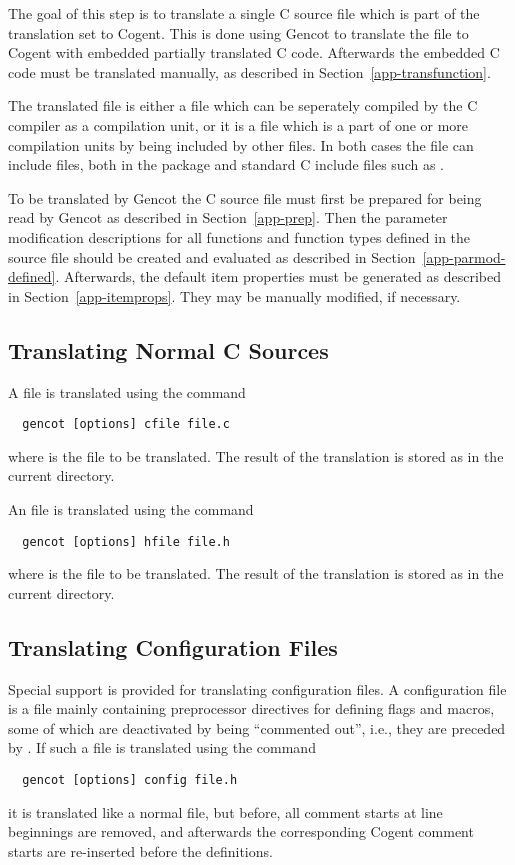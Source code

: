 The goal of this step is to translate a single C source file which is part of the translation set to Cogent.
This is done using Gencot to translate the file to Cogent with embedded partially translated C code.
Afterwards the embedded C code must be translated manually, as described in Section~\ref{app-transfunction}.

The translated file is either a  file which can be seperately compiled by the C compiler as a compilation unit,
or it is a  file which is a part of one or more compilation units by being included by other files. In both cases
the file can include  files, both in the package and standard C include files such as .

To be translated by Gencot the C source file must first be prepared for being read by Gencot as described in
Section~\ref{app-prep}. Then the parameter modification descriptions for all functions and function types defined 
in the source file should be created and evaluated as described in Section~\ref{app-parmod-defined}. Afterwards,
the default item properties must be generated as described in Section~\ref{app-itemprops}. They may be manually
modified, if necessary.

\subsection{Translating Normal C Sources}
\label{app-transauto-normal}

A  file is translated using the command
\begin{verbatim}
  gencot [options] cfile file.c
\end{verbatim}
where  is the file to be translated. The result of the translation is stored as  
in the current directory.

An  file is translated using the command
\begin{verbatim}
  gencot [options] hfile file.h
\end{verbatim}
where  is the file to be translated. The result of the translation is 
stored as  in the current directory.

\subsection{Translating Configuration Files}
\label{app-transauto-config}

Special support is provided for translating configuration files. A configuration file is a  file mainly
containing preprocessor directives for defining flags and macros, some of which are deactivated by being ``commented
out'', i.e., they are preceded by \code{//}. If such a file is translated using the command
\begin{verbatim}
  gencot [options] config file.h
\end{verbatim}
it is translated like a normal  file, but before, all \code{//} comment starts at line beginnings are 
removed, and afterwards the corresponding Cogent comment starts \code{-\relax-} are re-inserted before the definitions.

